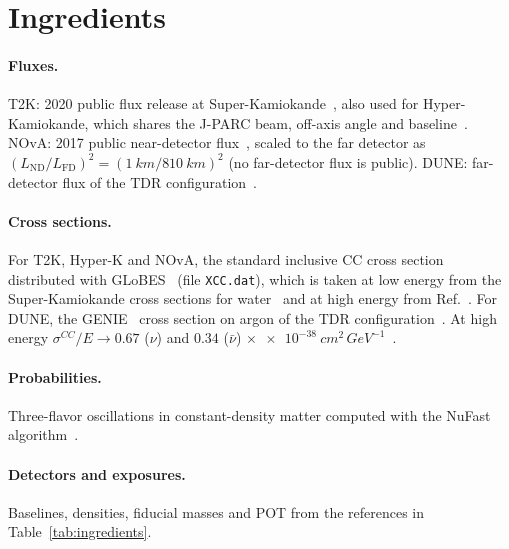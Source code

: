 \documentclass[11pt,a4paper]{article}
\begin{document}
\section{Ingredients}
\label{sec:ingredients}

\paragraph{Fluxes.} T2K: 2020 public flux release at Super-Kamiokande~\cite{T2Kflux2020,T2K:2012bge}, also used
for Hyper-Kamiokande, which shares the J-PARC beam, off-axis angle and baseline~\cite{Hyper-Kamiokande:2018ofw}.
NOvA: 2017 public near-detector flux~\cite{NOvAflux2017}, scaled to the far detector as
$(L_\text{ND}/L_\text{FD})^2 = (\SI{1}{km}/\SI{810}{km})^2$ (no far-detector flux is public).
DUNE: far-detector flux of the TDR configuration~\cite{DUNE:2021cuw}.

\paragraph{Cross sections.} For T2K, Hyper-K and NOvA, the standard inclusive CC cross section distributed with
GLoBES~\cite{Huber:2004ka,Huber:2007ji} (file \texttt{XCC.dat}), which is taken at low energy from the Super-Kamiokande
cross sections for water~\cite{Messier:1999kj} and at high energy from Ref.~\cite{Paschos:2001np}.
For DUNE, the GENIE~\cite{Andreopoulos:2009rq} cross section on argon of the TDR configuration~\cite{DUNE:2021cuw}.
At high energy $\sigma^{CC}/E \to 0.67$ ($\nu$) and $0.34$ ($\bar\nu$) $\times\SI{e-38}{cm^2\,GeV^{-1}}$~\cite{Formaggio:2012cpf}.

\paragraph{Probabilities.} Three-flavor oscillations in constant-density matter computed with the NuFast
algorithm~\cite{Denton:2024xmb}.

\paragraph{Detectors and exposures.} Baselines, densities, fiducial masses and POT from the references in
Table~\ref{tab:ingredients}.
\end{document}
